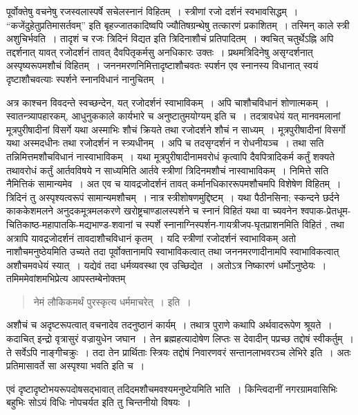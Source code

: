 {पूर्वोक्तेषु वचनेषु रजस्वलास्पर्षे सचेलस्नानं विहितम्~। स्त्रीणां रजो दर्शनं स्वभावसिद्धम्~। “कजेंदुहेतुप्रतिमासर्तवम्” इति बृहज्जातकादिष्वपि ज्यौतिषग्रन्थेषु तत्कारणं प्रकाशितम्~। तस्मिन् काले स्त्री अशुचिर्भवति~। तादृशं च रजः त्रिदिनं विद्यत इति त्रिदिनाशौचं प्रतिपादितम्~। क्वचित् चतुर्थेऽह्नि अपि तद्दर्शनात् यावत् रजोदर्शनं तावत् दैवपितृकर्मसु अनधिकारः उक्तः~। प्रथमत्रिदिनेषु असृग्दर्शनात् अस्पृष्यरूपमशौचं विहितम्~। जननमरणनिमित्तादृष्टाशौचवतः स्पर्शन एव स्नानस्य विधानात् स्वयं दृष्टाशौचवत्याः स्पर्शने स्नानविधानं नानुचितम्~। 

अत्र काश्चन विवदन्ते स्वच्छन्देन, यत् रजोदर्शनं स्वाभाविकम्~। अपि चाशौचविधानं शोणात्मकम्~। स्वातन्त्र्यापहारकम्, आधुनुककाले कार्यभारे च अनुष्टातुमयोग्यम् इति च~। तदत्रावधेयं यत् मानवमलानां मूत्रपुरीषादीनां विसर्गे यथा अस्माभिः शौचं क्रियते तथा रजोदर्शने शौचं न साध्यम्~। मूत्रपुरीषादीनां विसर्गो यथा अस्मदधीनः तथा रजोदर्शनं न स्त्र्यधीनम्~। अपि च तदसृग्दर्शनं न रोधनीयञ्च~। तथा सति तन्निमित्तमशौचविधानं नास्वाभाविकम्~। यथा मूत्रपुरीषादीनामवरोधं कृत्वापि दैवपित्रादिकर्म कर्तुं शक्यते तथावरोधं कर्तुं आर्तवविषये न साध्यमिति आर्तवे स्त्रीणां त्रिदिनमशौचं नास्वाभाविकम्~। निमित्ते सति नैमित्तिकं सामान्यमेव~। अत एव च यावद्रजोदर्शनं तावत् कर्मानधिकाररूपमशौचमपि विशेषेण विहितम्~। त्रिदिनं तु अस्पृश्यत्वरूपं सामान्यमशौचम्~। नात्र स्त्रीशोषणमुद्दिष्टम्~। यथा पैठीनसिना; स्कन्दने छर्दने काककेशमलने अनुदकमूत्रमलकरणे खरोष्ट्रचाण्डालस्पर्शने च स्नानं विहितं यथा वा च्यवनेन श्वपाक-प्रेतधूम-चितिकाष्ठ-महापातकि-मद्यभाण्ड-शवानां च स्पर्शे स्नानाग्निस्पर्शन-गायत्रीजप-घृतप्राशनमिति विहितं , तथा अत्रापि यावद्रजोदर्शनं तावदाशौचविधानं कृतम्~। यदि स्त्रीणां रजोदर्शनं स्वाभाविकम् अतो नाशौचमनुष्ठेयमिति उच्यते तदा पूर्वोक्तानामपि स्वाभाविकत्वात् तथा जननमरणादीनामपि स्वाभाविकत्वात् अशौचमवधेयं स्यात्~। यद्येवं तदा धर्मव्यवस्था एव उच्छिद्येत~। अतोऽत्र निष्कारणं धर्मोऽनुष्ठेयः~। तमिममेवांशमभिप्रेत्य आपस्तम्बेनोक्तम् 

\begin{verse}
नेमं लौकिकमर्थं पुरस्कृत्य धर्ममाचरेत्~। इति~। 
\end{verse}
अशौचं च अदृष्टरूपत्वात् वचनादेव तदनुष्ठानं कार्यम्~। तथात्र पुराणे कथापि अर्थवादरूपेण श्रूयते~। कदाचित् इन्द्रो वृत्रासुरं वज्रायुधेन जघान~। तेन ब्रह्महत्यादोषेण लिप्तः स देवादीन् पप्रच्छ तद्दोषं स्वीकर्तुम्~। ते सर्वेऽपि नाङ्गीचक्रुः~। तदा तेन प्रार्थिताः स्त्रियः तद्दोषं निवारणवरं सन्तानलाभवरञ्च लेभिरे इति~। अतः प्रतिमासावर्ते सा अस्पृश्या भवति इति च~। 

एवं दृष्टादृष्टोभयरूपदोषसद्भावात् तदिदमशौचमवश्यमनुष्टेयमिति भाति~। किन्त्विदानीं नगरग्रामवासिभिः बहुभिः सोऽयं विधिः नोपचर्यत इति तु चिन्तनीयो विषयः~। 

}
